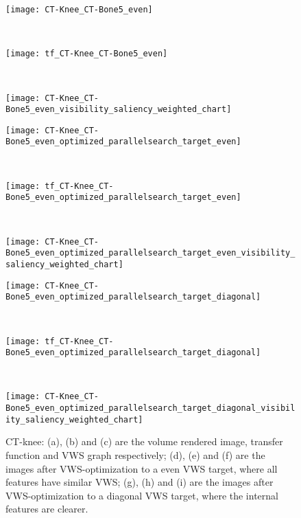 \begin{figure}
	\centering
	\begin{minipage}{.9\textwidth}%
		\begin{minipage}{.3\textwidth}
			\texttt{[image: CT-Knee\_CT-Bone5\_even]}
			\subcaption{}
		\end{minipage}~
		\begin{minipage}{.3\textwidth}
			\texttt{[image: tf\_CT-Knee\_CT-Bone5\_even]}
			\subcaption{}
		\end{minipage}~
		\begin{minipage}{.4\textwidth}
			\texttt{[image: CT-Knee\_CT-Bone5\_even\_visibility\_saliency\_weighted\_chart]}
			\subcaption{}
		\end{minipage}
		
		\begin{minipage}{.3\textwidth}
			\texttt{[image: CT-Knee\_CT-Bone5\_even\_optimized\_parallelsearch\_target\_even]}
			\subcaption{}
		\end{minipage}~
		\begin{minipage}{.3\textwidth}
			\texttt{[image: tf\_CT-Knee\_CT-Bone5\_even\_optimized\_parallelsearch\_target\_even]}
			\subcaption{}
		\end{minipage}~
		\begin{minipage}{.4\textwidth}
			\texttt{[image: CT-Knee\_CT-Bone5\_even\_optimized\_parallelsearch\_target\_even\_visibility\_saliency\_weighted\_chart]}
			\subcaption{}
		\end{minipage}
		
		\begin{minipage}{.3\textwidth}
			\texttt{[image: CT-Knee\_CT-Bone5\_even\_optimized\_parallelsearch\_target\_diagonal]}
			\subcaption{}
		\end{minipage}~
		\begin{minipage}{.3\textwidth}
			\texttt{[image: tf\_CT-Knee\_CT-Bone5\_even\_optimized\_parallelsearch\_target\_diagonal]}
			\subcaption{}
		\end{minipage}~
		\begin{minipage}{.4\textwidth}
			\texttt{[image: CT-Knee\_CT-Bone5\_even\_optimized\_parallelsearch\_target\_diagonal\_visibility\_saliency\_weighted\_chart]}
			\subcaption{}
		\end{minipage}
	\end{minipage}
	\caption{CT-knee: (a), (b) and (c) are the volume rendered image, transfer function and VWS graph respectively; (d), (e) and (f) are the images after VWS-optimization to a even VWS target, where all features have similar VWS; (g), (h) and (i) are the images after VWS-optimization to a diagonal VWS target, where the internal features are clearer.
	}
	\label{fig:CT-Knee_CT-Bone5_even}
\end{figure}


